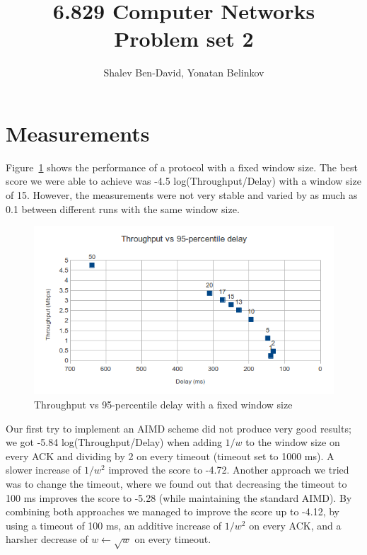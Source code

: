 \documentclass[a4paper,10pt]{article}
\title{6.829 Computer Networks\\Problem set 2}
\author{Shalev Ben-David, Yonatan Belinkov}
\begin{document}
\maketitle

\section{Measurements}
Figure~\ref{fig:fixedWindow} shows the performance of a protocol with a fixed window size. 
The best score we were able to achieve was -4.5 log(Throughput/Delay) with a window 
size of 15. However, the measurements were not very stable and varied by as much 
as 0.1 between different runs with the same window size. 

\begin{figure}[h]
 \begin{center}
  \includegraphics[width=1\textwidth]{fixedWindow.png}
  \end{center}
 \caption{Throughput vs 95-percentile delay with a fixed window size}
 \label{fig:fixedWindow}
\end{figure}

Our first try to implement an AIMD scheme did not produce very good results; we got
-5.84 log(Throughput/Delay) when adding $ 1/w $ to the window size on
every ACK and dividing by 2 on every timeout (timeout set to 1000 ms). A slower 
increase of $ 1/w^2 $ improved the score to -4.72. Another approach we tried was to
change the timeout, where we found out that decreasing the timeout to 100 ms improves
the score to -5.28 (while maintaining the standard AIMD). By combining both approaches
we managed to improve the score up to -4.12, by using a timeout of 100 ms, an additive 
increase of $ 1/w^2 $ on every ACK, and a harsher decrease of $ w \leftarrow \sqrt w $ 
on every timeout.
\end{document}
